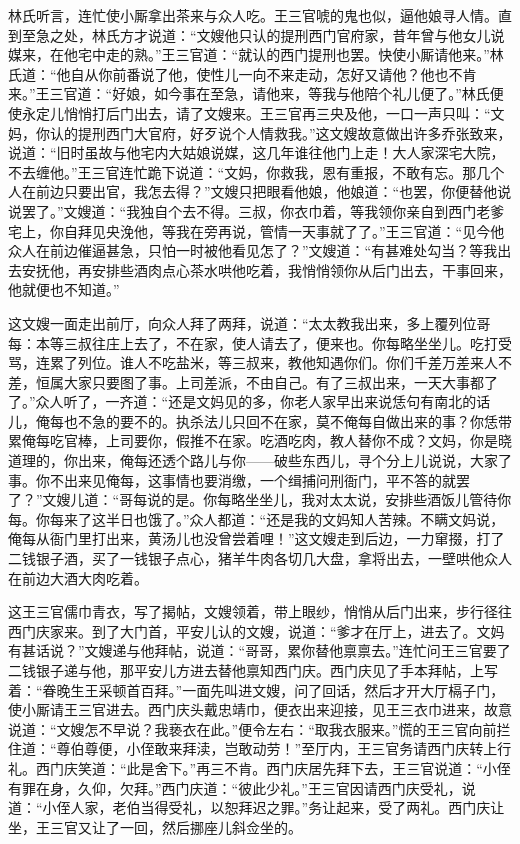 林氏听言，连忙使小厮拿出茶来与众人吃。王三官唬的鬼也似，逼他娘寻人情。直到至急之处，林氏方才说道：“文嫂他只认的提刑西门官府家，昔年曾与他女儿说媒来，在他宅中走的熟。”王三官道：“就认的西门提刑也罢。快使小厮请他来。”林氏道：“他自从你前番说了他，使性儿一向不来走动，怎好又请他？他也不肯来。”王三官道：“好娘，如今事在至急，请他来，等我与他陪个礼儿便了。”林氏便使永定儿悄悄打后门出去，请了文嫂来。王三官再三央及他，一口一声只叫：“文妈，你认的提刑西门大官府，好歹说个人情救我。”这文嫂故意做出许多乔张致来，说道：“旧时虽故与他宅内大姑娘说媒，这几年谁往他门上走！大人家深宅大院，不去缠他。”王三官连忙跪下说道：“文妈，你救我，恩有重报，不敢有忘。那几个人在前边只要出官，我怎去得？”文嫂只把眼看他娘，他娘道：“也罢，你便替他说说罢了。”文嫂道：“我独自个去不得。三叔，你衣巾着，等我领你亲自到西门老爹宅上，你自拜见央浼他，等我在旁再说，管情一天事就了了。”王三官道：“见今他众人在前边催逼甚急，只怕一时被他看见怎了？”文嫂道：“有甚难处勾当？等我出去安抚他，再安排些酒肉点心茶水哄他吃着，我悄悄领你从后门出去，干事回来，他就便也不知道。”

这文嫂一面走出前厅，向众人拜了两拜，说道：“太太教我出来，多上覆列位哥每：本等三叔往庄上去了，不在家，使人请去了，便来也。你每略坐坐儿。吃打受骂，连累了列位。谁人不吃盐米，等三叔来，教他知遇你们。你们千差万差来人不差，恒属大家只要图了事。上司差派，不由自己。有了三叔出来，一天大事都了了。”众人听了，一齐道：“还是文妈见的多，你老人家早出来说恁句有南北的话儿，俺每也不急的要不的。执杀法儿只回不在家，莫不俺每自做出来的事？你恁带累俺每吃官棒，上司要你，假推不在家。吃酒吃肉，教人替你不成？文妈，你是晓道理的，你出来，俺每还透个路儿与你——破些东西儿，寻个分上儿说说，大家了事。你不出来见俺每，这事情也要消缴，一个缉捕问刑衙门，平不答的就罢了？”文嫂儿道：“哥每说的是。你每略坐坐儿，我对太太说，安排些酒饭儿管待你每。你每来了这半日也饿了。”众人都道：“还是我的文妈知人苦辣。不瞒文妈说，俺每从衙门里打出来，黄汤儿也没曾尝着哩！”这文嫂走到后边，一力窜掇，打了二钱银子酒，买了一钱银子点心，猪羊牛肉各切几大盘，拿将出去，一壁哄他众人在前边大酒大肉吃着。

这王三官儒巾青衣，写了揭帖，文嫂领着，带上眼纱，悄悄从后门出来，步行径往西门庆家来。到了大门首，平安儿认的文嫂，说道：“爹才在厅上，进去了。文妈有甚话说？”文嫂递与他拜帖，说道：“哥哥，累你替他禀禀去。”连忙问王三官要了二钱银子递与他，那平安儿方进去替他禀知西门庆。西门庆见了手本拜帖，上写着：“眷晚生王采顿首百拜。”一面先叫进文嫂，问了回话，然后才开大厅槅子门，使小厮请王三官进去。西门庆头戴忠靖巾，便衣出来迎接，见王三衣巾进来，故意说道：“文嫂怎不早说？我亵衣在此。”便令左右：“取我衣服来。”慌的王三官向前拦住道：“尊伯尊便，小侄敢来拜渎，岂敢动劳！”至厅内，王三官务请西门庆转上行礼。西门庆笑道：“此是舍下。”再三不肯。西门庆居先拜下去，王三官说道：“小侄有罪在身，久仰，欠拜。”西门庆道：“彼此少礼。”王三官因请西门庆受礼，说道：“小侄人家，老伯当得受礼，以恕拜迟之罪。”务让起来，受了两礼。西门庆让坐，王三官又让了一回，然后挪座儿斜佥坐的。

